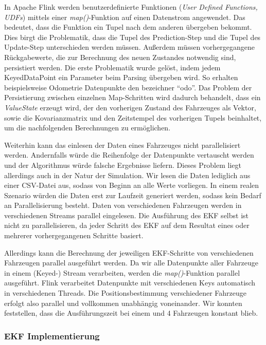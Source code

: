 \documentclass[11pt]{article}
\begin{document}
In Apache Flink werden benutzerdefinierte Funktionen (\textit{User Defined Functions, UDFs}) mittels einer \textit{map()}-Funktion auf einen Datenstrom angewendet. Das bedeutet, dass die Funktion ein Tupel nach dem anderen übergeben bekommt. Dies birgt die Problematik, dass die Tupel des Prediction-Step und die Tupel des Update-Step unterschieden werden müssen. Außerdem  müssen vorhergegangene Rückgabewerte, die zur Berechnung des neuen Zustandes notwendig sind, persistiert werden. Die erste Problematik wurde gelöst, indem jedem KeyedDataPoint ein Parameter beim Parsing übergeben wird. So erhalten beispielsweise Odometrie Datenpunkte den bezeichner “odo”. Das Problem der Persistierung zwischen einzelnen Map-Schritten wird dadurch behandelt, dass ein \textit{ValueState} erzeugt wird, der den vorherigen Zustand des Fahrzeuges als Vektor, sowie die Kovarianzmatrix und den Zeitstempel des vorherigen Tupels beinhaltet, um die nachfolgenden Berechnungen zu ermöglichen.

Weiterhin kann das einlesen der Daten eines Fahrzeuges nicht parallelisiert werden. Andernfalls würde die Reihenfolge der Datenpunkte vertauscht werden und der Algorithmus würde falsche Ergebnisse liefern. Dieses Problem liegt allerdings auch in der Natur der Simulation. Wir lesen die Daten lediglich aus einer CSV-Datei aus, sodass von Beginn an alle Werte vorliegen. In einem realen Szenario würden die Daten erst zur Laufzeit generiert werden, sodass kein Bedarf an Parallelisierung besteht. Daten von verschiedenen Fahrzeugen werden in verschiedenen Streams parallel eingelesen. Die Ausführung des EKF selbst ist nicht zu parallelisieren, da jeder Schritt des EKF auf dem Resultat eines oder mehrerer vorhergegangenen Schritte basiert.

Allerdings kann die Berechnung der jeweiligen EKF-Schritte von verschiedenen Fahrzeugen parallel ausgeführt werden. Da wir alle Datenpunkte aller Fahrzeuge in einem (Keyed-) Stream verarbeiten, werden die \textit{map()}-Funktion parallel ausgeführt. Flink verarbeitet Datenpunkte mit verschiedenen Keys automatisch in verschiedenen Threads. Die Positionsbestimmung verschiedener Fahrzeuge erfolgt also parallel und vollkommen unabhängig voneinander. Wir konnten feststellen, dass die Ausführungszeit bei einem und 4 Fahrzeugen konstant blieb.


\subsubsection{EKF Implementierung}\label{EKF-Implementierung}
\end{document}
